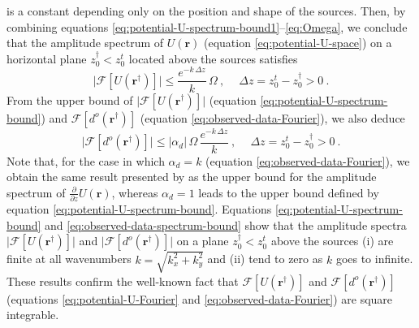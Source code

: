 is a constant depending only on the position and shape of the sources. 
Then, by combining equations 
\ref{eq:potential-U-spectrum-bound1}--\ref{eq:Omega},
we conclude that the amplitude spectrum of 
$U(\mathbf{r})$ (equation \ref{eq:potential-U-space}) on a horizontal plane 
$z^{\dagger}_{0} < z^{t}_{0}$ located above the sources satisfies 
\begin{equation}
	\vert \mathcal{F} [ U(\mathbf{r}^{\dagger}) ] \vert \le
	\frac{e^{- k \, \Delta z}}{k} \, \Omega \: ,
	\: \quad \Delta z = z^{t}_{0} - z^{\dagger}_{0} > 0 \: .
	\label{eq:potential-U-spectrum-bound}
\end{equation}
From the upper bound of $\vert \mathcal{F} [ U(\mathbf{r}^{\dagger}) ] \vert$
(equation \ref{eq:potential-U-spectrum-bound}) and $\mathcal{F} [ d^{o}(\mathbf{r}^{\dagger}) ]$
(equation \ref{eq:observed-data-Fourier}), we also deduce
\begin{equation}
	\vert \mathcal{F} [ d^{o}(\mathbf{r}^{\dagger}) ] \vert \le
	\vert \alpha_{d} \vert \, \Omega \, 
	\frac{e^{- k \, \Delta z}}{k} \: ,
	\: \quad \Delta z = z^{t}_{0} - z^{\dagger}_{0} > 0 \: .
	\label{eq:observed-data-spectrum-bound}
\end{equation}
Note that, for the case in which $\alpha_{d} = k$ (equation \ref{eq:observed-data-Fourier}), 
we obtain the same result presented by \citet{bhattacharyya1967} as the upper bound for the 
amplitude spectrum of $\tfrac{\partial}{\partial z} U(\mathbf{r})$, whereas
$\alpha_{d} = 1$ leads to the upper bound defined by equation \ref{eq:potential-U-spectrum-bound}.
Equations \ref{eq:potential-U-spectrum-bound} and \ref{eq:observed-data-spectrum-bound} 
show that the amplitude spectra 
$\vert \mathcal{F} [ U(\mathbf{r}^{\dagger}) ] \vert$ and 
$\vert \mathcal{F} [ d^{o}(\mathbf{r}^{\dagger}) ] \vert$ on a plane $z^{\dagger}_{0} < z^{t}_{0}$ 
above the sources 
(i) are finite at all wavenumbers $k = \sqrt{k_{x}^{2} + k_{y}^{2}}$ and (ii) tend
to zero as $k$ goes to infinite.
These results confirm the well-known fact that 
$\mathcal{F} [ U(\mathbf{r}^{\dagger}) ]$ and $\mathcal{F} [ d^{o}(\mathbf{r}^{\dagger}) ]$ 
(equations \ref{eq:potential-U-Fourier} and \ref{eq:observed-data-Fourier}) are square integrable.